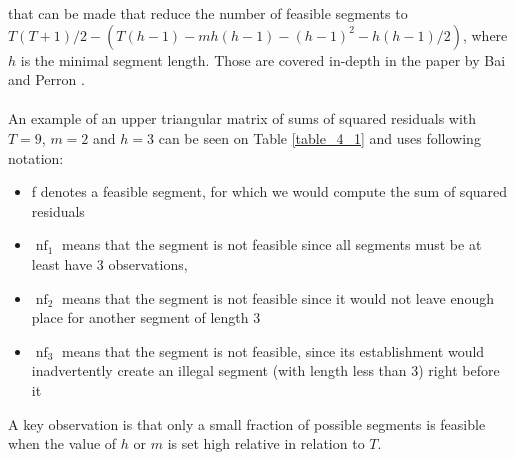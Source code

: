 \documentclass[main.tex]{subfiles}
\begin{document}
that can be made that reduce the number of feasible segments to
$T(T+1)/2 - \left(T(h-1)-m h(h-1)-(h-1)^{2}-h(h-1) / 2\right)$, where $h$ is the minimal
segment length. Those are covered in-depth
in the paper by Bai and Perron \cite{bai_perron}.\\\\
An example of an upper triangular matrix of sums of squared residuals with
$T=9$, $m=2$ and $h=3$ can be seen on Table \ref{table_4_1} and uses following
notation:
\begin{itemize}
\item f denotes a feasible segment, for which we would compute the sum of squared
  residuals
\item $\operatorname{nf}_1$ means that the segment is not
feasible since all segments must be at least have 3 observations, 
\item $\operatorname{nf}_2$ means that the segment is not feasible since it would not
leave enough place for another segment of length 3
\item $\operatorname{nf}_3$ means
that the segment is not feasible, since its establishment would inadvertently
create an illegal segment (with length less than 3) right before it
\end{itemize}
A key observation is that only a small fraction of possible segments is feasible when
the value of $h$ or $m$ is set high relative in relation to $T$.
\end{document}

